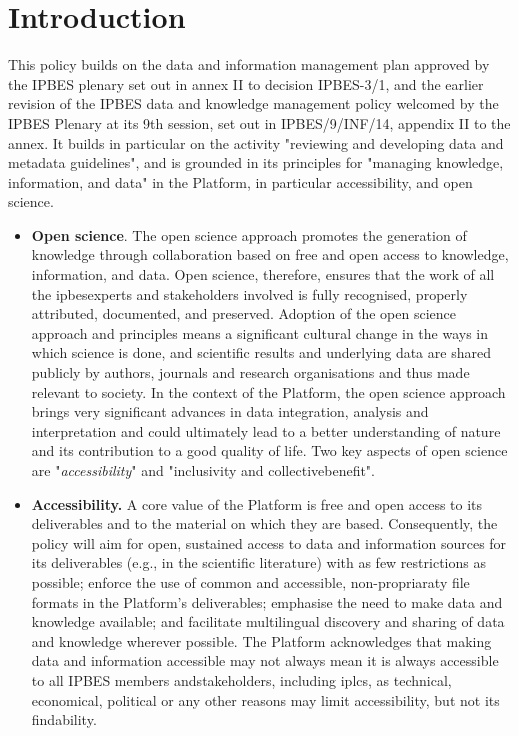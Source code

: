 \documentclass{article}
\begin{document}
\section{Introduction}

This policy builds on the data and information management plan approved by the IPBES \gls{plenary} set out in annex II to decision IPBES-3/1, and the earlier revision of the IPBES data and knowledge management policy welcomed by the IPBES Plenary at its 9th session, set out in IPBES/9/INF/14, appendix II to the annex. It builds in particular on the activity "reviewing and developing data and metadata guidelines", and is grounded in its principles for "managing knowledge, information, and data" in the Platform, in particular accessibility, and open science.


\begin{itemize}
    \item \textbf{Open science}. The open science approach promotes the generation of \gls{knowledge} through collaboration based on free and open access to \gls{knowledge}, information, and \gls{data}. Open science, therefore, ensures that the work of all the \glspl{ipbesexpert} and \glspl{stakeholder} involved is fully recognised, properly attributed, documented, and preserved. Adoption of the open science approach and principles means a significant cultural change in the ways in which science is done, and scientific results and underlying \gls{data} are shared publicly by authors, journals and research organisations and thus made relevant to society. In the context of the Platform, the open science approach brings very significant advances in \gls{data} integration, analysis and interpretation and could ultimately lead to a better understanding of nature and its contribution to a good quality of life. Two key aspects of open science are "\textit{accessibility}" and "inclusivity and \gls{collectivebenefit}".

    \item \textbf{Accessibility.} A core value of the Platform is free and open access to its deliverables and to the material on which they are based. Consequently, the policy will aim for open, sustained access to \gls{data} and information sources for its deliverables (e.g., in the scientific literature) with as few restrictions as possible; enforce the use of common and \gls{accessible}, non-propriaraty file formats in the Platform's deliverables; emphasise the need to make data and knowledge available;  and facilitate multilingual discovery and sharing of \gls{data} and \gls{knowledge} wherever possible. The Platform acknowledges that making \gls{data} and information \gls{accessible} may not always mean it is always \gls{accessible} to all IPBES members and\glspl{stakeholder}, including \glspl{iplc}, as technical, economical, political or any other reasons may limit accessibility, but not its findability.
    

\end{itemize}
\end{document}
